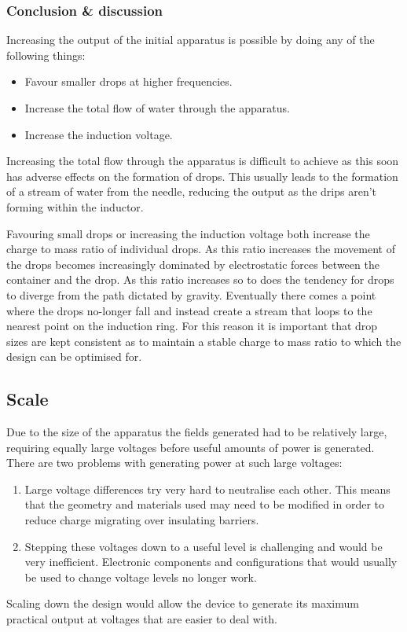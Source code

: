 \subsubsection*{Conclusion \& discussion}

Increasing the output of the initial apparatus is possible by doing
any of the following things:
\begin{itemize}
\item Favour smaller drops at higher frequencies.
\item Increase the total flow of water through the apparatus.
\item Increase the induction voltage.
\end{itemize}
Increasing the total flow through the apparatus is difficult to achieve
as this soon has adverse effects on the formation of drops. This usually
leads to the formation of a stream of water from the needle, reducing
the output as the drips aren't forming within the inductor.

Favouring small drops or increasing the induction voltage both increase
the charge to mass ratio of individual drops. As this ratio increases
the movement of the drops becomes increasingly dominated by electrostatic
forces between the container and the drop. As this ratio increases
so to does the tendency for drops to diverge from the path dictated
by gravity. Eventually there comes a point where the drops no-longer
fall and instead create a stream that loops to the nearest point on
the induction ring. For this reason it is important that drop sizes
are kept consistent as to maintain a stable charge to mass ratio to
which the design can be optimised for.


\subsection{Scale}

Due to the size of the apparatus the fields generated had to be relatively
large, requiring equally large voltages before useful amounts of power
is generated. There are two problems with generating power at such
large voltages:
\begin{enumerate}
\item Large voltage differences try very hard to neutralise each other.
This means that the geometry and materials used may need to be modified
in order to reduce charge migrating over insulating barriers.
\item Stepping these voltages down to a useful level is challenging and
would be very inefficient. Electronic components and configurations
that would usually be used to change voltage levels no longer work.
\end{enumerate}
Scaling down the design would allow the device to generate its maximum
practical output at voltages that are easier to deal with.



